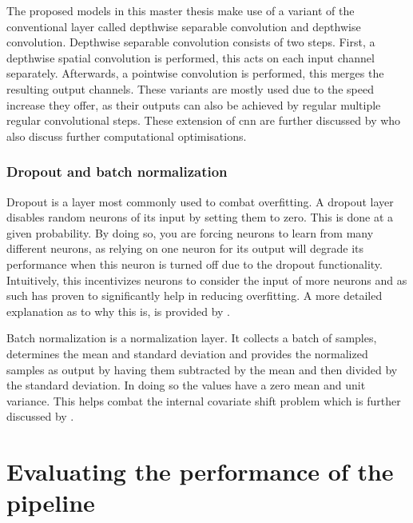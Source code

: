 The proposed models in this master thesis make use of a variant of the conventional layer called depthwise separable convolution and depthwise convolution.
Depthwise separable convolution consists of two steps.
First, a depthwise spatial convolution is performed, this acts on each input channel separately.
Afterwards, a pointwise convolution is performed, this merges the resulting output channels.
These variants are mostly used due to the speed increase they offer, as their outputs can also be achieved by regular multiple regular convolutional steps.
These extension of \gls{cnn} are further discussed by \citet{lu_optimizing_2022} who also discuss further computational optimisations.


\subsubsection{Dropout and batch normalization}
\label{subsubsec:processing_signals_ml_and_dl_dl_classifiers_drop}

Dropout is a layer most commonly used to combat overfitting.
A dropout layer disables random neurons of its input by setting them to zero.
This is done at a given probability.
By doing so, you are forcing neurons to learn from many different neurons, as relying on one neuron for its output will degrade its performance when this neuron is turned off due to the dropout functionality.
Intuitively, this incentivizes neurons to consider the input of more neurons and as such has proven to significantly help in reducing overfitting.
A more detailed explanation as to why this is, is provided by \citet{dropout}.

Batch normalization is a normalization layer.
It collects a batch of samples, determines the mean and standard deviation and provides the normalized samples as output by having them subtracted by the mean and then divided by the standard deviation.
In doing so the values have a zero mean and unit variance.
This helps combat the internal covariate shift problem which is further discussed by \citet{ioffe_batch_2015}.

\section{Evaluating the performance of the pipeline}
\label{sec:processing_signals_evaluating_and_using}

